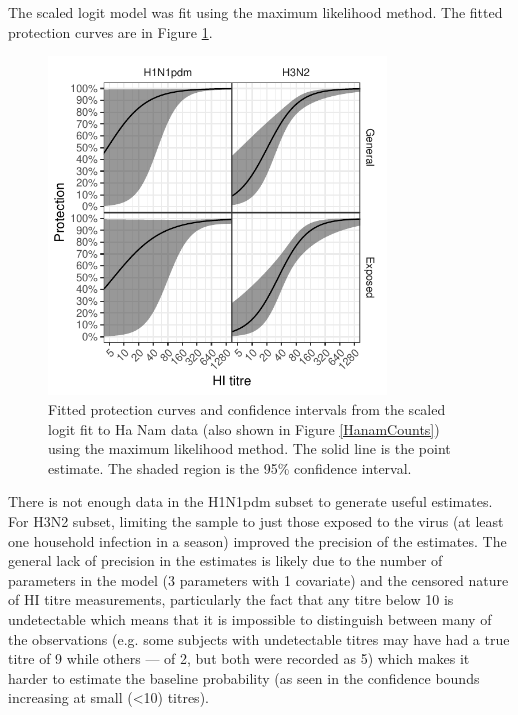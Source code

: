 The scaled logit model was fit using the maximum likelihood method. The fitted protection curves are in Figure \ref{fig:fit-sclr-prot}.

\begin{figure}[htp]
	\centering
	\includegraphics[width=0.8\textwidth]{../fit-sclr-plot/hanam-hi-prot.pdf}
	\caption{
	Fitted protection curves and confidence intervals from the scaled logit fit to Ha Nam data (also shown in Figure \ref{HanamCounts}) using the maximum likelihood method. The solid line is the point estimate. The shaded region is the 95\% confidence interval.
	}
	\label{fig:fit-sclr-prot}
\end{figure}

There is not enough data in the H1N1pdm subset to generate useful estimates. For H3N2 subset, limiting the sample to just those exposed to the virus (at least one household infection in a season) improved the precision of the estimates. The general lack of precision in the estimates is likely due to the number of parameters in the model (3 parameters with 1 covariate) and the censored nature of HI titre measurements, particularly the fact that any titre below 10 is undetectable which means that it is impossible to distinguish between many of the observations (e.g. some subjects with undetectable titres may have had a true titre of 9 while others --- of 2, but both were recorded as 5) which makes it harder to estimate the baseline probability (as seen in the confidence bounds increasing at small (<10) titres).
